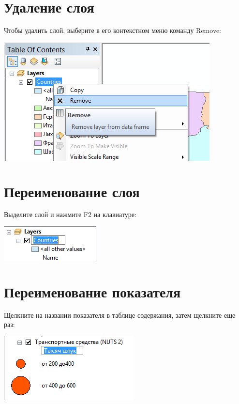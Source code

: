 \documentclass[]{book}
\theoremstyle{definition}
\theoremstyle{definition}
\theoremstyle{definition}
\theoremstyle{remark}
\begin{document}
\hypertarget{-}{%
\section{Удаление слоя}\label{-}}

Чтобы удалить слой, выберите в его контекстном меню команду Remove:

\includegraphics{images/Appendix/image7.png}

\hypertarget{-}{%
\section{Переименование слоя}\label{-}}

Выделите слой и нажмите F2 на клавиатуре:

\includegraphics{images/Appendix/image8.png}

\hypertarget{-}{%
\section{Переименование показателя}\label{-}}

Щелкните на названии показателя в таблице содержания, затем щелкните еще
раз:

\includegraphics{images/Appendix/image9.png}
\end{document}
